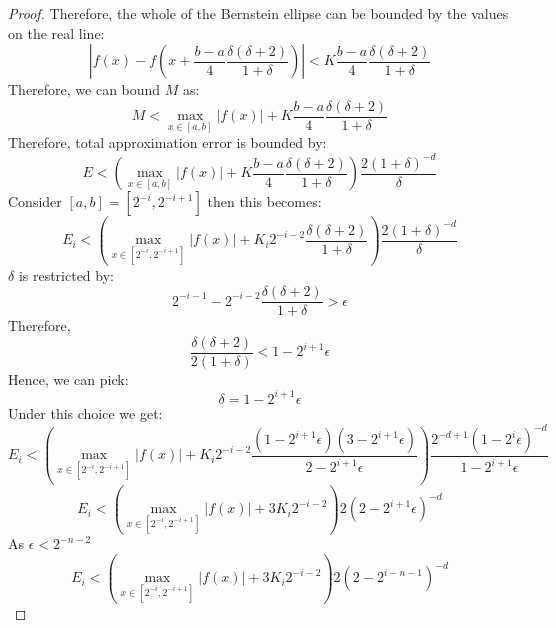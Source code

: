 \documentclass[aps]{revtex4-2}
\begin{document}
\begin{proof}
    Therefore, the whole of the Bernstein ellipse can be bounded by the values on the real line:
    \begin{equation}
        |f(x) - f(x + \frac{b-a}{4}\frac{\delta(\delta + 2)}{1+\delta})| < K \frac{b-a}{4}\frac{\delta(\delta + 2)}{1+\delta}
    \end{equation}
    Therefore, we can bound $M$ as:
    \begin{equation}
        M < \max_{x \in [a,b]} |f(x)| + K\frac{b-a}{4}\frac{\delta(\delta + 2)}{1+\delta}
    \end{equation}
    Therefore, total approximation error is bounded by:
    \begin{equation}
        E < \left(\max_{x \in [a,b]} |f(x)| + K\frac{b-a}{4}\frac{\delta(\delta + 2)}{1+\delta}\right) \frac{2(1+\delta)^{-d}}{\delta}
    \end{equation}
    Consider $[a,b] = [2^{-i}, 2^{-i+1}]$ then this becomes:
    \begin{equation}
        E_i < \left(\max_{x \in [2^{-i}, 2^{-i+1}]} |f(x)| + K_i2^{-i-2}\frac{\delta(\delta + 2)}{1+\delta}\right) \frac{2(1+\delta)^{-d}}{\delta}
    \end{equation}
    $\delta$ is restricted by:
    \begin{equation}
        2^{-i-1} - 2^{-i-2}\frac{\delta(\delta + 2)}{1+\delta} > \epsilon
    \end{equation}
    Therefore,
    \begin{equation}
         \frac{\delta(\delta + 2)}{2(1+\delta)} < 1 - 2^{i+1}\epsilon
    \end{equation}
    Hence, we can pick:
    \begin{equation}
        \delta = 1 - 2^{i+1}\epsilon
    \end{equation}
    Under this choice we get:
    \begin{equation}
        E_i < \left(\max_{x \in [2^{-i}, 2^{-i+1}]} |f(x)| + K_i2^{-i-2}\frac{(1 - 2^{i+1}\epsilon)(3 - 2^{i+1}\epsilon)}{2 - 2^{i+1}\epsilon}\right) \frac{2^{-d+1}(1 - 2^{i}\epsilon)^{-d}}{1 - 2^{i+1}\epsilon}
    \end{equation}
    \begin{equation}
        E_i < \left(\max_{x \in [2^{-i}, 2^{-i+1}]} |f(x)| + 3K_i2^{-i-2}\right) 2(2 - 2^{i+1}\epsilon)^{-d}
    \end{equation}
    As $\epsilon < 2^{-n-2}$
    \begin{equation}
        E_i < \left(\max_{x \in [2^{-i}, 2^{-i+1}]} |f(x)| + 3K_i2^{-i-2}\right) 2(2 - 2^{i-n-1})^{-d}

\end{equation}
\end{proof}
\end{document}
